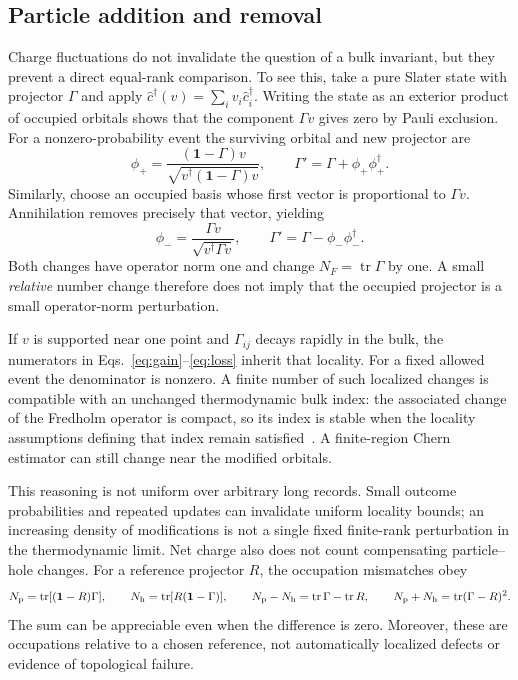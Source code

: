 \documentclass[aps,prb,onecolumn,nofootinbib,superscriptaddress]{revtex4-2}
\newcommand{\id}{\mathbf{1}}
\newcommand{\tr}{\operatorname{tr}}
\begin{document}
\subsection{Particle addition and removal}

Charge fluctuations do not invalidate the question of a bulk invariant, but
they prevent a direct equal-rank comparison. To see this, take a pure Slater
state with projector $\Gamma$ and apply
$\hat c^\dagger(v)=\sum_i v_i\hat c_i^\dagger$.
Writing the state as an exterior product of occupied orbitals shows that
the component $\Gamma v$ gives zero by Pauli exclusion. For a nonzero-probability
event the surviving orbital and new projector are
\begin{equation}
 \phi_+=\frac{(\id-\Gamma)v}{\sqrt{v^\dagger(\id-\Gamma)v}},\qquad
 \Gamma'=\Gamma+\phi_+\phi_+^\dagger.
 \label{eq:gain}
\end{equation}
Similarly, choose an occupied basis whose first vector is proportional to
$\Gamma v$. Annihilation removes precisely that vector, yielding
\begin{equation}
 \phi_-=\frac{\Gamma v}{\sqrt{v^\dagger\Gamma v}},\qquad
 \Gamma'=\Gamma-\phi_-\phi_-^\dagger.
 \label{eq:loss}
\end{equation}
Both changes have operator norm one and change
$N_F=\tr\Gamma$ by one. A small \emph{relative} number change therefore does
not imply that the occupied projector is a small operator-norm perturbation.

If $v$ is supported near one point and $\Gamma_{ij}$ decays rapidly in the
bulk, the numerators in Eqs.~\eqref{eq:gain}--\eqref{eq:loss} inherit that
locality. For a fixed allowed event the denominator is nonzero. A finite
number of such localized changes is compatible with an unchanged
thermodynamic bulk index: the associated change of the Fredholm operator
is compact, so its index is stable when the locality assumptions defining
that index remain satisfied~\cite{Bellissard1994}. A finite-region Chern
estimator can still change near the modified orbitals.

This reasoning is not uniform over arbitrary long records. Small outcome
probabilities and repeated updates can invalidate uniform locality bounds;
an increasing density of modifications is not a single fixed finite-rank
perturbation in the thermodynamic limit. Net charge also does not count
compensating particle--hole changes. For a reference projector $R$, the
occupation mismatches obey
\begin{equation}
 N_{\rm p}=\tr[(\id-R)\Gamma],\qquad
 N_{\rm h}=\tr[R(\id-\Gamma)],\qquad
 N_{\rm p}-N_{\rm h}=\tr\Gamma-\tr R,\qquad
 N_{\rm p}+N_{\rm h}=\tr(\Gamma-R)^2.
 \label{eq:mismatches}
\end{equation}
The sum can be appreciable even when the difference is zero. Moreover,
these are occupations relative to a chosen reference, not automatically
localized defects or evidence of topological failure.
\end{document}
